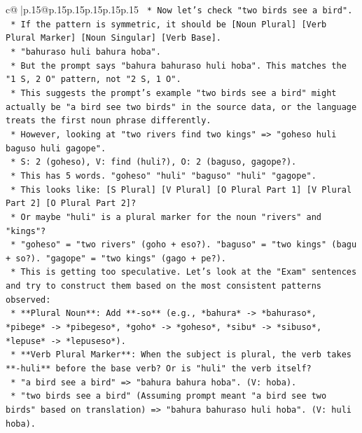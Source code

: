 \documentclass{article}
\begin{document}
{\begin{supertabular}{c@{$\;$}|p{.15\linewidth}@{}p{.15\linewidth}p{.15\linewidth}p{.15\linewidth}p{.15\linewidth}p{.15\linewidth}}
{{{\texttt{                *   Now let's check "two birds see a bird".} \\
\texttt{                *   If the pattern is symmetric, it should be {[}Noun Plural{]} {[}Verb Plural Marker{]} {[}Noun Singular{]} {[}Verb Base{]}.} \\
\texttt{                *   "bahuraso huli bahura hoba".} \\
\texttt{                *   But the prompt says "bahura bahuraso huli hoba". This matches the "1 S, 2 O" pattern, not "2 S, 1 O".} \\
\texttt{                *   This suggests the prompt's example "two birds see a bird" might actually be "a bird see two birds" in the source data, or the language treats the first noun phrase differently.} \\
\texttt{                *   However, looking at "two rivers find two kings" => "goheso huli baguso huli gagope".} \\
\texttt{                    *   S: 2 (goheso), V: find (huli?), O: 2 (baguso, gagope?).} \\
\texttt{                    *   This has 5 words. "goheso" "huli" "baguso" "huli" "gagope".} \\
\texttt{                    *   This looks like: {[}S Plural{]} {[}V Plural{]} {[}O Plural Part 1{]} {[}V Plural Part 2{]} {[}O Plural Part 2{]}?} \\
\texttt{                    *   Or maybe "huli" is a plural marker for the noun "rivers" and "kings"?} \\
\texttt{                    *   "goheso" = "two rivers" (goho + eso?). "baguso" = "two kings" (bagu + so?). "gagope" = "two kings" (gago + pe?).} \\
\texttt{                    *   This is getting too speculative. Let's look at the "Exam" sentences and try to construct them based on the most consistent patterns observed:} \\
\texttt{                        *   **Plural Noun**: Add **{-}so** (e.g., *bahura* {-}> *bahuraso*, *pibege* {-}> *pibegeso*, *goho* {-}> *goheso*, *sibu* {-}> *sibuso*, *lepuse* {-}> *lepuseso*).} \\
\texttt{                        *   **Verb Plural Marker**: When the subject is plural, the verb takes **{-}huli** before the base verb? Or is "huli" the verb itself?} \\
\texttt{                        *   "a bird see a bird" => "bahura bahura hoba". (V: hoba).} \\
\texttt{                        *   "two birds see a bird" (Assuming prompt meant "a bird see two birds" based on translation) => "bahura bahuraso huli hoba". (V: huli hoba).} \\
}}}
\end{supertabular}}
\end{document}
